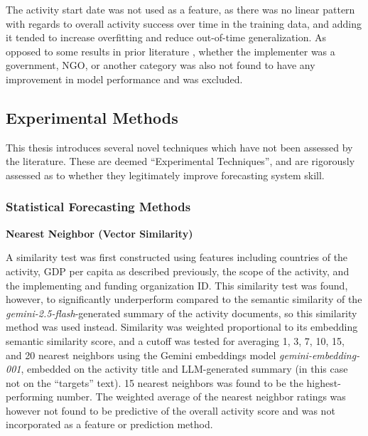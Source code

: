 The activity start date was not used as a feature, as there was no linear pattern with regards to overall activity success over time in the training data, and adding it tended to increase overfitting and reduce out-of-time generalization. As opposed to some results in prior literature \citep{vivaltHowMuchCan2020} \citep{ashtonPuzzleMissingPieces2021}, whether the implementer was a government, NGO, or another category was also not found to have any improvement in model performance and was excluded.


\subsection{Experimental Methods}

This thesis introduces several novel techniques which have not been assessed by the literature. These are deemed ``Experimental Techniques'', and are rigorously assessed as to whether they legitimately improve forecasting system skill.

\subsubsection{Statistical Forecasting Methods}

\textbf{Nearest Neighbor (Vector Similarity)} \label{ssub:nearest_neighbor_vector_similarity}

A similarity test was first constructed using features including countries of the activity, GDP per capita as described previously, the scope of the activity, and the implementing and funding organization ID.
This similarity test was found, however, to significantly underperform compared to the semantic similarity of the \emph{gemini-2.5-flash}-generated summary of the activity documents, so this similarity method was used instead.
Similarity was weighted proportional to its embedding semantic similarity score, and a cutoff was tested for averaging 1, 3, 7, 10, 15, and 20 nearest neighbors using the Gemini embeddings model \emph{gemini-embedding-001}, embedded on the activity title and LLM-generated summary (in this case not on the ``targets'' text). 15 nearest neighbors was found to be the highest-performing number. The weighted average of the nearest neighbor ratings was however not found to be predictive of the overall activity score and was not incorporated as a feature or prediction method.

